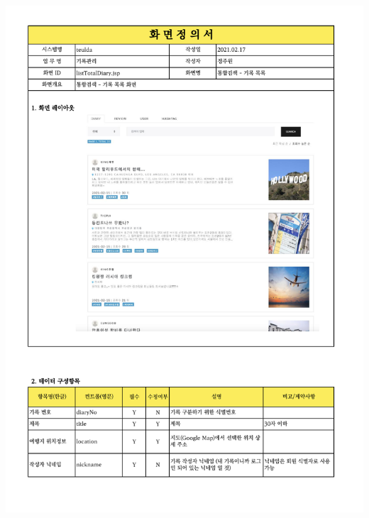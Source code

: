 {{{{{{{{{{{{{{{{{{{{{{{{{{{{{{{{{{{{{{{{{{{{{{{{{{{{{{{{{{{{{{{{{{{{{{{{{{{{{{\includegraphics[width=20cm]{./Figure/Design/Display/totalSearch/totalSearch_01.pdf} \\
}}}}}}}}}}}}}}}}}}}}}}}}}}}}}}}}}}}}}}}}}}}}}}}}}}}}}}}}}}}}}}}}}}}}}}}}}}}}}}
